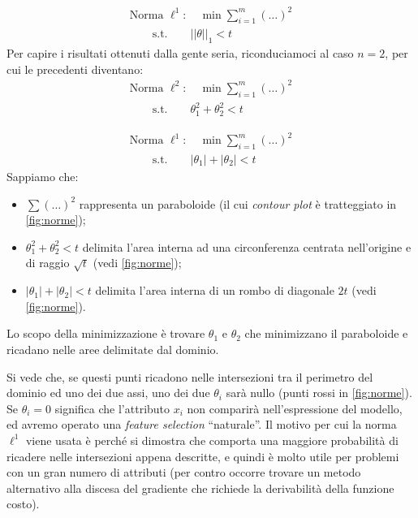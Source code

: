  \begin{gather}
\text{Norma }\ell^1:
\quad \min\sum_{i=1}^m(\dots)^2 \\
\qquad \text{s.t.} \qquad ||\theta||_1 < t
\end{gather}
Per capire i risultati ottenuti dalla gente seria, riconduciamoci al caso $n=2$, per cui le precedenti diventano:
\begin{gather}
\text{Norma }\ell^2:
\quad \min\sum_{i=1}^m(\dots)^2 \\
\qquad \text{s.t.} \qquad \theta_1^2 + \theta_2^2 < t
\end{gather}
 
 \begin{gather}
\text{Norma }\ell^1:
\quad \min\sum_{i=1}^m(\dots)^2 \\
\qquad \text{s.t.} \qquad |\theta_1|+|\theta_2| < t
\end{gather}
Sappiamo che:
\begin{itemize}
\item $\sum(\dots)^2$ rappresenta un paraboloide (il cui \emph{contour plot} è tratteggiato in \autoref{fig:norme});
\item $\theta_1^2 + \theta_2^2 < t$ delimita l'area interna ad una circonferenza centrata nell'origine e di raggio $\sqrt{t}$ (vedi \autoref{fig:norme});
\item $|\theta_1|+|\theta_2| < t$ delimita l'area interna di un rombo di diagonale $2t$ (vedi \autoref{fig:norme}).
\end{itemize}
Lo scopo della minimizzazione è trovare $\theta_1$ e $\theta_2$ che minimizzano il paraboloide e ricadano nelle aree delimitate dal dominio. 



Si vede che, se questi punti ricadono nelle intersezioni tra il perimetro del dominio ed uno dei due assi, uno dei due $\theta_i$ sarà nullo (punti rossi in \autoref{fig:norme}). Se $\theta_i=0$ significa che l'attributo $x_i$ non comparirà nell'espressione del modello, ed avremo operato una \emph{feature selection} ``naturale''. Il motivo per cui la norma $\ell^1$ viene usata è perché si dimostra che comporta una maggiore probabilità di ricadere nelle intersezioni appena descritte, e quindi è molto utile per problemi con un gran numero di attributi (per contro occorre trovare un metodo alternativo alla discesa del gradiente che richiede la derivabilità della funzione costo).


